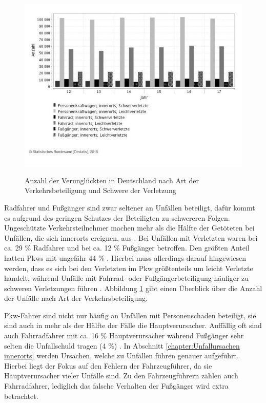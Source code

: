 \begin{savenotes}
	\begin{figure}[H]
		\centering
		\includegraphics[width=12cm,height=9cm]{figures/Verkehrsbeteiligung}
		\caption[Anzahl der Unfälle innerorts nach Art der Verkehrsbeteiligung und Schwere der Verletzung]{Anzahl der Verunglückten in Deutschland nach Art der Verkehrsbeteiligung und Schwere der Verletzung \parencite{StatistischesBundesamt.2018d}}\label{fig:Verkehrsbeteiligung}
	\end{figure}
\end{savenotes}

Radfahrer und Fußgänger sind zwar seltener an Unfällen beteiligt, dafür kommt es aufgrund des geringen Schutzes der Beteiligten zu schwereren Folgen. Ungeschützte Verkehrsteilnehmer machen mehr als die Hälfte der Getöteten bei Unfällen, die sich innerorts ereignen, aus \parencite[S. 221]{Schreiber.2014}. Bei Unfällen mit Verletzten waren bei ca. 29 \% Radfahrer und bei ca. 12 \% Fußgänger betroffen. Den größten Anteil hatten Pkws mit ungefähr 44 \% \parencite[S. 139-142]{StatistischesBundesamt.2018c}. Hierbei muss allerdings darauf hingewiesen werden, dass es sich bei den Verletzten im Pkw größtenteils um leicht Verletzte handelt, während Unfälle mit Fahrrad- oder Fußgängerbeteiligung häufiger zu schweren Verletzungen führen \parencite[S. 145-148]{StatistischesBundesamt.2018c}. 
Abbildung \ref{fig:Verkehrsbeteiligung} gibt einen Überblick über die Anzahl der Unfälle nach Art der Verkehrsbeteiligung.

Pkw-Fahrer sind nicht nur häufig an Unfällen mit Personenschaden beteiligt, sie sind auch in mehr als der Hälfte der Fälle die Hauptverursacher. Auffällig oft sind auch Fahrradfahrer mit ca. 16 \% Hauptverursacher während Fußgänger sehr selten die Unfallschuld tragen (4 \%) \parencite[S. 105]{StatistischesBundesamt.2018c}. In Abschnitt \ref{chapter:Unfallursachen innerorts} werden Ursachen, welche zu Unfällen führen genauer aufgeführt. Hierbei liegt der Fokus auf den Fehlern der Fahrzeugführer, da sie Hauptverursacher vieler Unfälle sind. Zu den Fahrzeugführern zählen auch Fahrradfahrer, lediglich das falsche Verhalten der Fußgänger wird extra betrachtet.

